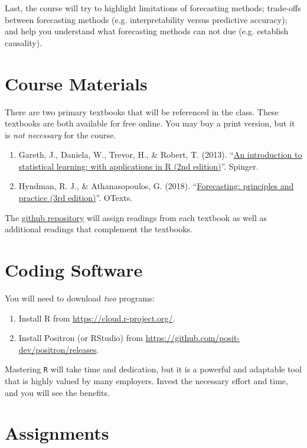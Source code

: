 \documentclass[12pt]{article}
\begin{document}
Last, the course will try to highlight limitations of forecasting methods; trade-offs between forecasting methods (e.g. interpretability versus predictive accuracy); and help you understand what forecasting methods can not due (e.g. establish causality). 


\newpage
\section*{Course Materials}

There are two primary textbooks that will be referenced in the class. These textbooks are both available for free online. You may buy a print version, but it is \emph{not necessary} for the course. 

\begin{enumerate}
  \item Gareth, J., Daniela, W., Trevor, H., \& Robert, T. (2013). ``\href{https://www.statlearning.com}{An introduction to statistical learning: with applications in R (2nd edition)}''. Spinger.
  \item Hyndman, R. J., \& Athanasopoulos, G. (2018). ``\href{https://otexts.com/fpp3/}{Forecasting: principles and practice (3rd edition)}''. OTexts.
\end{enumerate}

The \href{https://github.com/kylebutts/UARK_5753}{github repository} will assign readings from each textbook as well as additional readings that complement the textbooks.

\section*{Coding Software}

You will need to download \emph{two} programs:
\begin{enumerate}
  \item Install R from \url{https://cloud.r-project.org/}.
  \item Install Positron (or RStudio) from \url{https://github.com/posit-dev/positron/releases}. 
\end{enumerate}

\bigskip
Mastering \texttt{R} will take time and dedication, but it is a powerful and adaptable tool that is highly valued by many employers. Invest the necessary effort and time, and you will see the benefits.

\newpage
\section*{Assignments}
\end{document}
